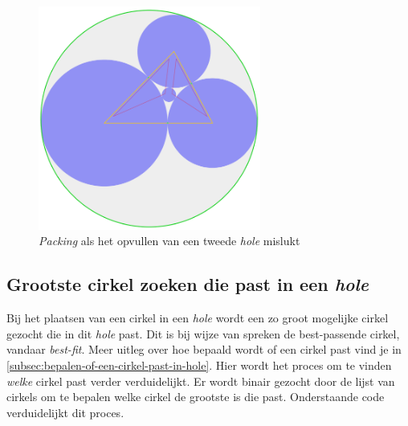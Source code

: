 \documentclass[12pt,a4paper,oneside]{book}
\begin{document}
\begin{figure}
  \centering
  \includegraphics[width=0.65\textwidth]{voorbeeld-gat-stap-3alt.png}
  \caption{\textit{Packing} als het opvullen van een tweede \textit{hole} mislukt} \label{fig:voorbeeld-gat-stap-3alt} 
\end{figure}

\subsection{Grootste cirkel zoeken die past in een \textit{hole}} \label{sec:grootste-cirkel-zoeken-die-past-in-een-hole}

Bij het plaatsen van een cirkel in een \textit{hole} wordt een zo groot mogelijke cirkel gezocht die in dit \textit{hole} past.
Dit is bij wijze van spreken de best-passende cirkel, vandaar \textit{best-fit}.
Meer uitleg over hoe bepaald wordt of een cirkel past vind je in \autoref{subsec:bepalen-of-een-cirkel-past-in-hole}.
Hier wordt het proces om te vinden \textit{welke} cirkel past verder verduidelijkt.
Er wordt binair gezocht door de lijst van cirkels om te bepalen welke cirkel de grootste is die past.
Onderstaande code verduidelijkt dit proces.
\end{document}
